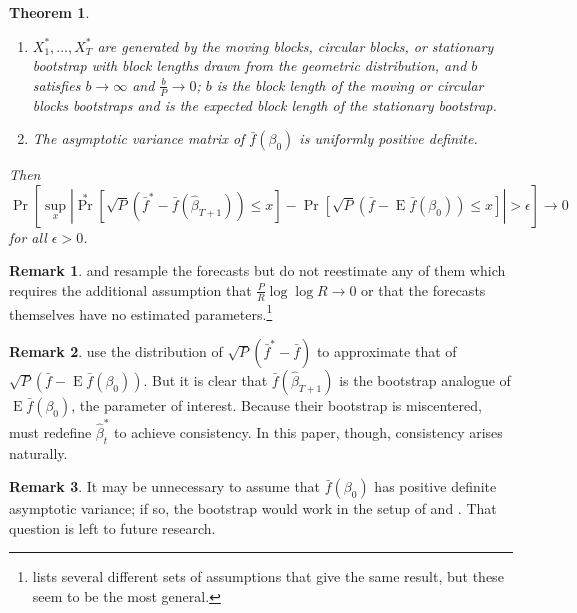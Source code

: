 \documentclass[10pt,fleqn,draft]{article}
\newtheorem{thm}{Theorem}
\theoremstyle{definition}
\newtheorem{rem}{Remark}
\DeclareMathOperator{\E}{E}
\DeclareMathOperator{\pr}{Pr}
\begin{document}
\begin{thm}
\begin{enumerate}
  \item $X_1^{*},\dots,X_T^{*}$ are generated by the moving blocks,
    circular blocks, or stationary bootstrap with block lengths drawn
    from the geometric distribution, and $b$ satisfies $b \to \infty$
    and $\frac{b}{P} \to 0$; $b$ is the block length of the moving or
    circular blocks bootstraps and is the expected block length of the
    stationary bootstrap.
  \item The asymptotic variance matrix of $\bar{f}(\beta_0)$ is
    uniformly positive definite.
  \end{enumerate}
  Then
  \begin{equation}
    \pr[\sup_x | \pr^*[\sqrt{P} (\bar{f}^* - \bar{f}(\hat{\beta}_{T+1}))
        \leq x] - \pr[\sqrt{P}( \bar{f} - \E \bar{f}(\beta_0)) \leq x] | >
      \epsilon] \to 0
  \end{equation}
  for all $\epsilon > 0$.
\end{thm}

\begin{rem}
  \citet{Whi:00} and \citet{Han:05} resample the forecasts but do not
  reestimate any of them which requires the additional assumption that
  $\tfrac{P}{R} \log \log R \to 0$ or that the forecasts themselves
  have no estimated parameters.\footnote{\citet{Whi:00} lists several
    different sets of assumptions that give the same result, but these
    seem to be the most general.}
\end{rem}

\begin{rem}
  \citet{CoS:07} use the distribution of $\sqrt{P}(\bar{f}^{*} -
  \bar{f})$ to approximate that of $\sqrt{P}(\bar{f} - \E
  \bar{f}(\beta_0))$.  But it is clear that
  $\bar{f}(\hat{\beta}_{T+1})$ is the bootstrap analogue of $\E
  \bar{f}(\beta_0)$, the parameter of interest.  Because their
  bootstrap is miscentered, \citet{CoS:07} must redefine
  $\hat{\beta}_t^{*}$ to achieve consistency.  In this paper, though,
  consistency arises naturally.
\end{rem}

\begin{rem}
  It may be unnecessary to assume that $\bar{f}(\beta_0)$ has positive
  definite asymptotic variance; if so, the bootstrap would work in the
  setup of \citet{ClM:05,ClM:01} and \citet{Mcc:07}.  That question is
  left to future research.
\end{rem}
\end{document}
